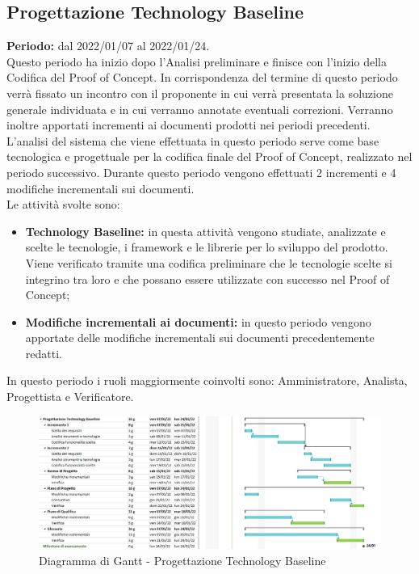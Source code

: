 \subsection{Progettazione Technology Baseline} \label{subsection:pianificazione_TB}
\textbf{Periodo:} dal 2022/01/07 al 2022/01/24.
\bigskip
\\Questo periodo ha inizio dopo l'Analisi preliminare e finisce con l'inizio della Codifica del Proof of Concept.
In corrispondenza del termine di questo periodo verrà fissato un incontro con il proponente in cui verrà presentata la soluzione generale individuata e in cui verranno annotate eventuali correzioni.
Verranno inoltre apportati incrementi ai documenti prodotti nei periodi precedenti.
L'analisi del sistema che viene effettuata in questo periodo serve come base tecnologica e progettuale per la codifica finale del Proof of Concept, realizzato nel periodo successivo.
Durante questo periodo vengono effettuati 2 incrementi e 4 modifiche incrementali sui documenti.
\\Le attività svolte sono:
\begin{itemize}
  \item \textbf{Technology Baseline:} in questa attività vengono studiate, analizzate e scelte le tecnologie, i framework e le librerie per lo sviluppo del prodotto.
  Viene verificato tramite una codifica preliminare che le tecnologie scelte si integrino tra loro e che possano essere utilizzate con successo nel Proof of Concept;
  \item \textbf{Modifiche incrementali ai documenti:} in questo periodo vengono apportate delle modifiche incrementali sui documenti precedentemente redatti.
\end{itemize}
In questo periodo i ruoli maggiormente coinvolti sono: Amministratore, Analista, Progettista e Verificatore.
\bigskip
\begin{figure}[H]
  \centering
   \includegraphics[scale=0.56]{immagini/technology_baseline.png}
   \caption{Diagramma di Gantt - Progettazione Technology Baseline}
 \end{figure}
 \pagebreak

